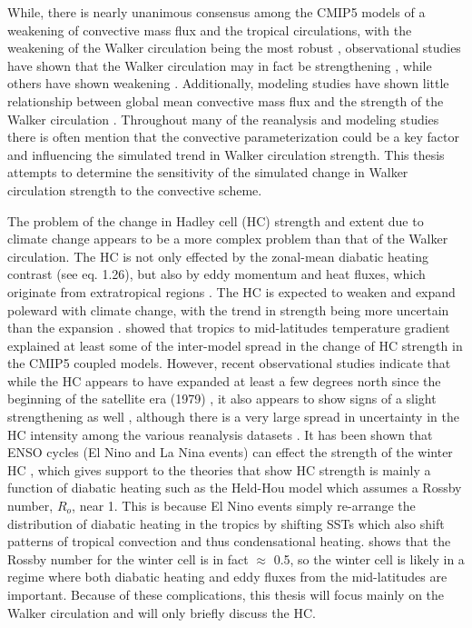 \documentclass[letterpaper,12pt,titlepage,oneside,final]{book}
\begin{document}
While, there is nearly unanimous consensus among the CMIP5 models of a weakening of convective mass flux \citep{chadwick_spatial_2012} and the tropical circulations, with the weakening of the Walker circulation being the most robust \citep{he_anthropogenic_2015}, observational studies have shown that the Walker circulation may in fact be strengthening \citep{lheureux_recent_2013,sandeep_pacific_2014}, while others have shown weakening \citep{vecchi_weakening_2006,power_what_2011}. Additionally, modeling studies have shown little relationship between global mean convective mass flux and the strength of the Walker circulation \citep{sandeep_pacific_2014}. Throughout many of the reanalysis and modeling studies there is often mention that the convective parameterization could be a key factor and influencing the simulated trend in Walker circulation strength. This thesis attempts to determine the sensitivity of the simulated change in Walker circulation strength to the convective scheme.  

The problem of the change in Hadley cell (HC) strength and extent due to climate change appears to be a more complex problem than that of the Walker circulation. The HC is not only effected by the zonal-mean diabatic heating contrast (see eq. 1.26), but also by eddy momentum and heat fluxes, which originate from extratropical regions \citep{walker_eddy_2006,kim_hadley_2001}. The HC is expected to weaken and expand poleward with climate change, with the trend in strength being more uncertain than the expansion \citep{he_anthropogenic_2015,vecchi_global_2007,bony_robust_2013,gastineau_hadley_2009,ma_mechanisms_2011,lu_expansion_2007}. \citep{seo_mechanism_2014} showed that tropics to mid-latitudes temperature gradient explained at least some of the inter-model spread in the change of HC strength 
in the CMIP5 coupled models. However, recent observational studies indicate that while the HC appears to have expanded at least a few degrees north since the beginning of the satellite era (1979) \citep{johanson_hadley_2009,seidel_recent_2007,hu_observed_2007}, it also appears to show signs of a slight strengthening as well \citep{mitas_has_2005,hu_observed_2007,stachnik_comparison_2011}, although there is a very large spread in uncertainty in the HC intensity among the various reanalysis datasets \citep{stachnik_comparison_2011}. It has been shown that ENSO cycles (El Nino and La Nina events) can effect the strength of the winter HC \citep{oort_observed_1996,quan_change_2004}, which gives support to the theories that show HC strength is mainly a function of diabatic heating such as the Held-Hou model \citep{held_nonlinear_1980} which assumes a Rossby number, $R_{o}$, near 1. This is because El Nino events simply re-arrange the distribution of diabatic heating in the tropics by shifting SSTs which also shift patterns of tropical convection and thus condensational heating. \citep{caballero_role_2007} shows that the Rossby number for the winter cell is in fact $\approx$ 0.5, so the winter cell is likely in a regime where both diabatic heating and eddy fluxes from the mid-latitudes are important. Because of these complications, this thesis will focus mainly on the Walker circulation and will only briefly discuss the HC.
\end{document}
